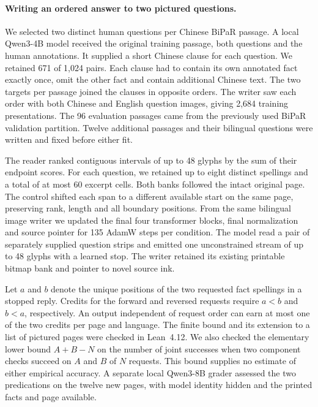 \paragraph{Writing an ordered answer to two pictured questions.}
We selected two distinct human questions per Chinese BiPaR passage. A local Qwen3-4B model received the original training passage, both questions and the human annotations. It supplied a short Chinese clause for each question. We retained 671 of 1,024 pairs. Each clause had to contain its own annotated fact exactly once, omit the other fact and contain additional Chinese text. The two targets per passage joined the clauses in opposite orders. The writer saw each order with both Chinese and English question images, giving 2,684 training presentations. The 96 evaluation passages came from the previously used BiPaR validation partition. Twelve additional passages and their bilingual questions were written and fixed before either fit.

The reader ranked contiguous intervals of up to 48 glyphs by the sum of their endpoint scores. For each question, we retained up to eight distinct spellings and a total of at most 60 excerpt cells. Both banks followed the intact original page. The control shifted each span to a different available start on the same page, preserving rank, length and all boundary positions. From the same bilingual image writer we updated the final four transformer blocks, final normalization and source pointer for 135 AdamW steps per condition. The model read a pair of separately supplied question strips and emitted one unconstrained stream of up to 48 glyphs with a learned stop. The writer retained its existing printable bitmap bank and pointer to novel source ink.

Let $a$ and $b$ denote the unique positions of the two requested fact spellings in a stopped reply. Credits for the forward and reversed requests require $a<b$ and $b<a$, respectively. An output independent of request order can earn at most one of the two credits per page and language. The finite bound and its extension to a list of pictured pages were checked in Lean~4.12. We also checked the elementary lower bound $A+B-N$ on the number of joint successes when two component checks succeed on $A$ and $B$ of $N$ requests. This bound supplies no estimate of either empirical accuracy. A separate local Qwen3-8B grader assessed the two predications on the twelve new pages, with model identity hidden and the printed facts and page available.

